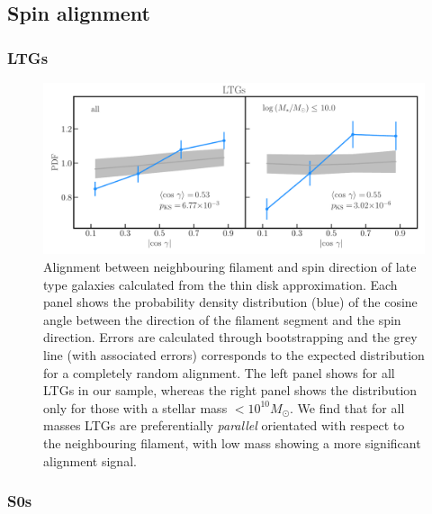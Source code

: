 \subsection{Spin alignment}
\subsubsection{LTGs}

\begin{figure}
    \centering
    \includegraphics[width=\linewidth]{thesis/latex/halo_assembly_manga/spin_fil_LTGs_2in1.pdf}
    \caption{Alignment between neighbouring filament and spin direction of late type galaxies calculated from the thin disk approximation. Each panel shows the probability density distribution (blue) of the cosine angle between the direction of the filament segment and the spin direction. Errors are calculated through bootstrapping and the grey line (with associated errors) corresponds to the expected distribution for a completely random alignment. The left panel shows for all LTGs in our sample, whereas the right panel shows the distribution only for those with a stellar mass $< 10^{10} M_{\odot}$. We find that for all masses LTGs are preferentially \textit{parallel} orientated with respect to the neighbouring filament, with low mass showing a more significant alignment signal.}
    \label{fig:ltgs_spin_alignment} 
\end{figure}

\subsubsection{S0s}

